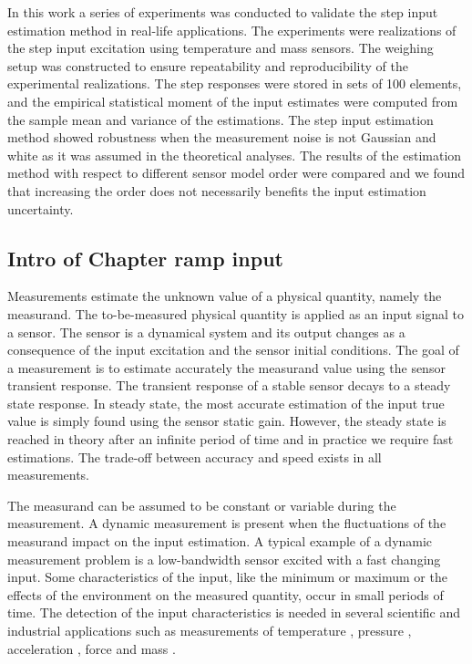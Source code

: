 In this work a series of experiments was conducted to validate the step input estimation method in real-life applications.
The experiments were realizations of the step input excitation using temperature and mass sensors.
The weighing setup was constructed to ensure repeatability and reproducibility of the experimental realizations.
The step responses were stored in sets of 100 elements, and the empirical statistical moment of the input estimates were computed from the sample mean and variance of the estimations.
The step input estimation method showed robustness when the measurement noise is not Gaussian and white as it was assumed in the theoretical analyses.
The results of the estimation method with respect to different sensor model order were compared and we found that increasing the order does not necessarily benefits the input estimation uncertainty.


\subsection{Intro of Chapter ramp input}

Measurements estimate the unknown value of a physical quantity, namely the measurand.
The to-be-measured physical quantity is applied as an input signal to a sensor. 
The sensor is a dynamical system and its output changes as a consequence of the input excitation and the sensor initial conditions.
The goal of a measurement is to estimate accurately the measurand value using the sensor transient response.
The transient response of a stable sensor decays to a steady state response.
In steady state, the most accurate estimation of the input true value is simply found using the sensor static gain.
However, the steady state is reached in theory after an infinite period of time and in practice we require fast estimations.
The trade-off between accuracy and speed exists in all measurements.

The measurand can be assumed to be constant or variable during the measurement.
A dynamic measurement is present when the fluctuations of the measurand impact on the input estimation.
A typical example of a dynamic measurement problem is a low-bandwidth sensor excited with a fast changing input.
Some characteristics of the input, like the minimum or maximum or the effects of the environment on the measured quantity, occur in small periods of time.  
The detection of the input characteristics is needed in several scientific and industrial applications such as measurements of temperature \cite{Saggin01}, pressure \cite{Matthews14}, acceleration \cite{Link07}, force \cite{Vlajic16, Hessling08a} and mass \cite{Shu93, Boschetti13}.

